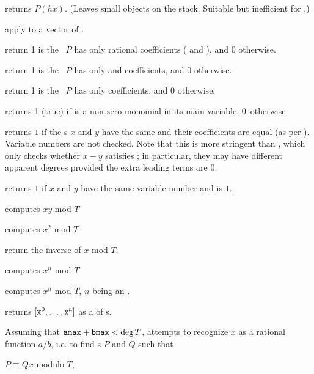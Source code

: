  returns $P(h x)$. (Leaves small objects
on the stack. Suitable but inefficient for .)

 apply  to a vector
of .

 return 1 is the ~$P$ has only
rational coefficients ( and ), and 0 otherwise.

 return 1 is the ~$P$ has only
 and  coefficients, and 0 otherwise.

 return 1 is the ~$P$ has only
 coefficients, and 0 otherwise.

 returns 1 (true) if  is a non-zero
monomial in its main variable, 0~otherwise.

 returns $1$ if the s $x$ and $y$
have the same  and their coefficients are equal (as per
). Variable numbers are not checked. Note that this is more
stringent than , which only checks whether $x - y$ satisfies
; in particular, they may have different apparent degrees provided
the extra leading terms are $0$.

 returns $1$ if $x$ and $y$
have the same variable number and  is $1$.
\smallskip

 computes $xy$ mod $T$

 computes $x^2$ mod $T$

 return the inverse of $x$ mod $T$.

 computes $x^n$ mod $T$

 computes $x^n$ mod $T$,
$n$ being an .

 returns $[{\tt x}^0,
\dots, {\tt x}^{\tt n}]$ as a  of s.

Assuming that ${\tt amax}+{\tt bmax}<\deg T$, attempts to recognize $x$ as a
rational function $a/b$, i.e. to find s $P$ and $Q$ such that

\item $P \equiv Q x$ modulo $T$,

